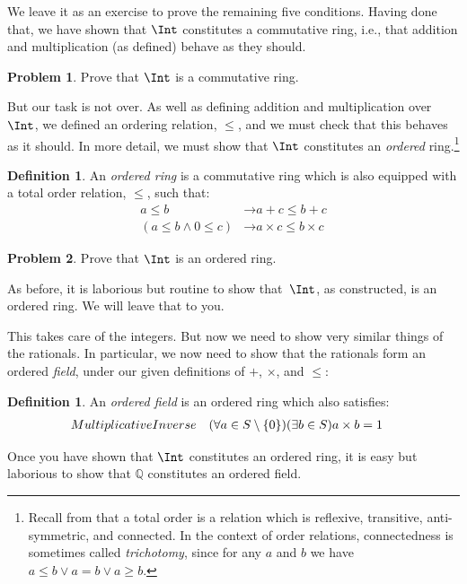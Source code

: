 \documentclass[10pt,a4paper]{article}
\makeatletter
\theoremstyle{plain}
\theoremstyle{definition}
\newtheorem{defn}[thm]{Definition}
\newtheorem{prob}{Problem}[section]
\theoremstyle{remark}
\newcommand*{\ollabel}[1]{\label{#1}}
\newcommand{\olref}{\@ifnextchar[{\olref@i}{\olref@final}}
\def\olref@i[#1]{\@ifnextchar[{\olref@ii}{\olref@final}}
\def\olref@ii[#1]{\@ifnextchar[{\olref@iii}{\olref@final}}
\def\olref@iii[#1]{\olref@final}
\def\olref@final#1{\ref{#1}}
\providecommand{\lif}{\mathbin{\rightarrow}}
\providecommand{\Rat}{\mathbb{Q}}
\makeatother
\begin{document}
We leave it as an exercise to prove the remaining five conditions.
Having done that, we have shown that $\Int$ constitutes a commutative
ring, i.e., that addition and multiplication (as defined) behave as
they should.

\begin{prob}
Prove that $\Int$ is a commutative ring.
\end{prob}

But our task is not over. As well as defining addition and
multiplication over $\Int$, we defined an ordering relation, $\leq$,
and we must check that this behaves as it should. In more detail, we
must show that $\Int$ constitutes an \emph{ordered} ring.\footnote{Recall
	from \olref[sfr][rel][ord]{def:linearorder} that a total order
	is a relation which is reflexive, transitive, anti-symmetric, and connected. 
	In the context of order relations, connectedness is sometimes called
	\emph{trichotomy}, since for any $a$ and $b$ we have $a \leq b \lor a
	= b \lor a \geq b$.} 

\begin{defn}
An \emph{ordered ring} is a commutative ring which is also equipped
with a total order relation, $\leq$, such that:
\begin{align*}
	a \leq b &\lif a + c \leq b + c\\
	(a \leq b \land 0 \leq c) &\lif a \times c \leq b \times c
\end{align*}
\end{defn}

\begin{prob}
Prove that $\Int$ is an ordered ring. 
\end{prob}

As before, it is laborious but routine to show that~$\Int$, as
constructed, is an ordered ring. We will leave that to you.

This takes care of the integers. But now we need to show very similar
things of the rationals. In particular, we now need to show that the
rationals form an ordered \emph{field}, under our given definitions of
$+$, $\times$, and $\leq$:
\begin{defn}\ollabel{orderedfield}
An \emph{ordered field} is an ordered ring which also satisfies:
\begin{align*}
	\emph{Multiplicative Inverse}& & (\forall a \in S \setminus \{0\})(\exists b \in S) a\times b& = 1
\end{align*}
\end{defn}

Once you have shown that $\Int$ constitutes an ordered ring, it is
easy but laborious to show that $\Rat$ constitutes an ordered field.
\end{document}

